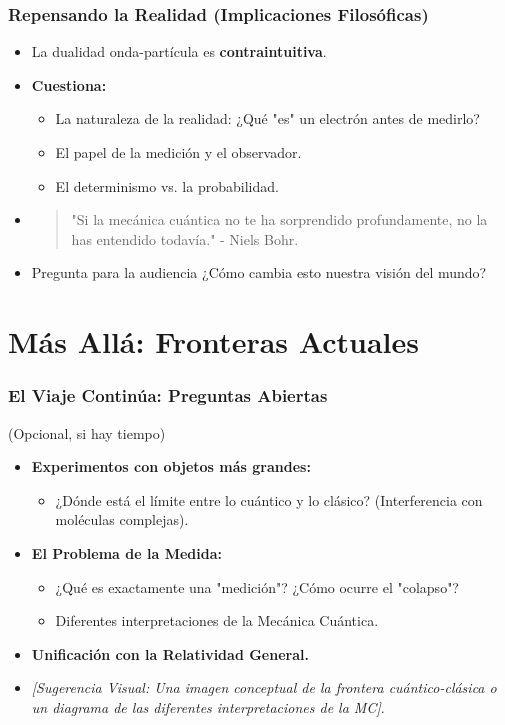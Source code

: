 \documentclass{beamer}
\begin{document}
	\begin{frame}
		\frametitle{Repensando la Realidad (Implicaciones Filosóficas)}
		\begin{itemize}
			\item La dualidad onda-partícula es \textbf{contraintuitiva}. \pause
			\item \textbf{Cuestiona:}
			\begin{itemize}
				\item La naturaleza de la realidad: ¿Qué "es" un electrón antes de medirlo?
				\item El papel de la medición y el observador.
				\item El determinismo vs. la probabilidad.
			\end{itemize} \pause
			\item \begin{quote}
				"Si la mecánica cuántica no te ha sorprendido profundamente, no la has entendido todavía." - Niels Bohr.
			\end{quote} \pause
			\item \begin{alertblock}{Pregunta para la audiencia}
				¿Cómo cambia esto nuestra visión del mundo?
			\end{alertblock}
		\end{itemize}
	\end{frame}
	
	\section{Más Allá: Fronteras Actuales}
	
	\begin{frame}
		\frametitle{El Viaje Continúa: Preguntas Abiertas}
		(Opcional, si hay tiempo)
		\begin{itemize}
			\item \textbf{Experimentos con objetos más grandes:}
			\begin{itemize}
				\item ¿Dónde está el límite entre lo cuántico y lo clásico? (Interferencia con moléculas complejas).
			\end{itemize} \pause
			\item \textbf{El Problema de la Medida:}
			\begin{itemize}
				\item ¿Qué es exactamente una "medición"? ¿Cómo ocurre el "colapso"?
				\item Diferentes interpretaciones de la Mecánica Cuántica.
			\end{itemize} \pause
			\item \textbf{Unificación con la Relatividad General.} \pause
			\item \textit{[Sugerencia Visual: Una imagen conceptual de la frontera cuántico-clásica o un diagrama de las diferentes interpretaciones de la MC]}.
		\end{itemize}
	\end{frame}
	
\end{document}
